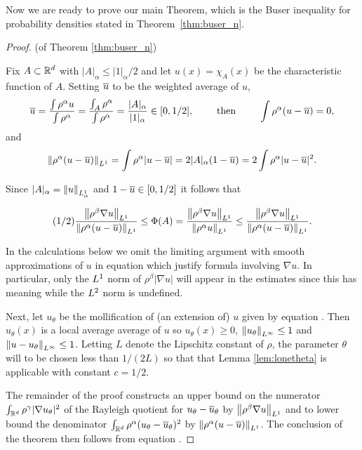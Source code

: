Now we are ready to prove our main Theorem, which is the Buser
inequality for probability densities stated in
Theorem~\ref{thm:buser_n}.
\begin{proof} (of Theorem \ref{thm:buser_n})

Fix $A \subset \mathbb{R}^d$ with $|A|_\alpha \leq |1|_\alpha / 2$ and let
$u(x) = \chi_A(x)$ be the characteristic function of $A$. Setting 
${\overline{u}}$ to be the weighted average of $u$,
\[
{\overline{u}} 
= \frac{\int \rho^\alpha u}{\int \rho^\alpha}
= \frac{\int_A \rho^\alpha}{\int \rho^\alpha}
= \frac{|A|_\alpha}{|1|_\alpha} \in [0,1/2],
\qquad \text{ then } \qquad
\int \rho^\alpha (u-{\overline{u}}) = 0,
\]
and
  \begin{equation}\label{eqn:blah}
\left\lVert \rho^\alpha(u-{\overline{u}}) \right\rVert_{L^1} 
= \int \rho^\alpha |u-{\overline{u}}| = 2 |A|_\alpha (1-{\overline{u}})
= 2 \int \rho^\alpha |u-{\overline{u}}|^2.
  \end{equation}

Since $|A|_\alpha = \left\lVert u \right\rVert_{L^1_\alpha}$ and $1-{\overline{u}} \in [0,1/2]$ it follows that

\begin{equation} \label{eqn:PhiA}
  (1/2) \frac{\left\lVert \rho^\beta \nabla u \right\rVert_{L^1}}{\left\lVert \rho^\alpha(u-{\overline{u}}) \right\rVert_{L^1}} 
  \leq \Phi(A) = \frac{\left\lVert \rho^\beta \nabla u \right\rVert_{L^1}}{\left\lVert \rho^\alpha u \right\rVert_{L^1}}
  \leq \frac{\left\lVert \rho^\beta \nabla u \right\rVert_{L^1}}{\left\lVert \rho^\alpha(u-{\overline{u}}) \right\rVert_{L^1}}.
\end{equation}

In the calculations below we omit the limiting argument with smooth
approximations of $u$ in equation  which justify
formula involving $\nabla u$. In particular, only the ${L^1}$ norm
of $\rho^\beta |\nabla u|$ will appear in the estimates since this
has meaning while the ${L^2}$ norm is undefined.

Next, let $u_\theta$ be the mollification of (an extension of) $u$
given by equation . Then $u_\theta(x)$ is a local
average average of $u$ so $u_\theta(x) \geq 0$, $\left\lVert u_\theta \right\rVert_{{L^\infty}} \leq
1$ and $\left\lVert u-u_\theta \right\rVert_{{L^\infty}} \leq 1$.  Letting $L$ denote the Lipschitz
constant of $\rho$, the parameter $\theta$ will to be chosen 
less than $1/(2L)$ so that that Lemma \ref{lem:lonetheta} is applicable
with constant $c = 1/2$.

The remainder of the proof constructs an upper bound on the numerator
  $\int_{\mathbb{R}^d} \rho^\gamma |\nabla u_\theta|^2$ of the Rayleigh quotient
for $u_\theta - {\overline{u}}_\theta$ by $\left\lVert \rho^\beta \nabla u \right\rVert_{L^1}$ and to
  lower bound the denominator $\int_{\mathbb{R}^d} \rho^\alpha (u_\theta -
{\overline{u}}_\theta)^2$ by $\left\lVert \rho^\alpha (u-{\overline{u}}) \right\rVert_{L^1}$. The conclusion
of the theorem then follows from equation .




\end{proof}

